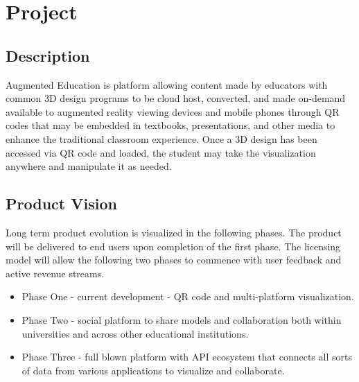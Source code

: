 \section{Project}


\subsection{Description}
Augmented Education is platform allowing content made by educators with common 3D design programs to be cloud host, converted, and made on-demand available to augmented reality viewing devices and mobile phones through QR codes that may be embedded in textbooks, presentations, and other media to enhance the traditional classroom experience. Once a 3D design has been accessed via QR code and loaded, the student may take the visualization anywhere and manipulate it as needed.   

\subsection{Product Vision}
Long term product evolution is visualized in the following phases. The product will be delivered to end users upon completion of the first phase. The licensing model will allow the following two phases to commence with user feedback and active revenue streams. 

\begin{itemize}
\item Phase One - current development - QR code and multi-platform visualization.
\item Phase Two - social platform to share models and collaboration both within universities and across other educational institutions.
\item Phase Three - full blown platform with API ecosystem that connects all sorts of data from various applications to visualize and collaborate.
\end{itemize}

